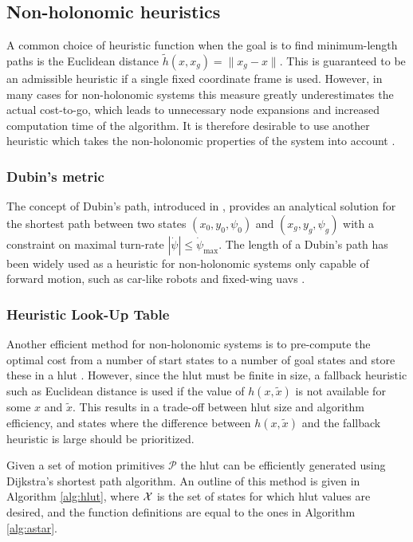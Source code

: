 \subsection{Non-holonomic heuristics}
A common choice of heuristic function when the goal is to find minimum-length paths is the Euclidean distance $\tilde{h}(x, x_g)=\|x_g-x\|$. This is guaranteed to be an admissible heuristic if a single fixed coordinate frame is used. However, in many cases for
non-holonomic systems this measure greatly underestimates the actual cost-to-go, which leads to unnecessary node expansions and 
increased computation time of the algorithm. It is therefore desirable to use another heuristic which takes the non-holonomic properties 
of the system into account \cite{state_lattice_planning}.

\subsubsection{Dubin's metric}
The concept of Dubin's path, introduced in \cite{dubins}, provides an analytical solution for the
shortest path between two states $(x_0,y_0,\psi_0)$ and $(x_g,y_g,\psi_g)$ with a constraint on maximal turn-rate $|\dot{\psi}|\leq\dot{\psi}_{\text{max}}$.
The length of a Dubin's path has been widely used as a heuristic for non-holonomic systems only capable of forward motion, such as car-like robots and fixed-wing \acp{uav} \cite{2_phase_uav}.

\subsubsection{Heuristic Look-Up Table}\label{sec:hlut}
Another efficient method for non-holonomic systems is to pre-compute the optimal cost from a number of start states to 
a number of goal states and store these in a \ac{hlut} \cite{hlut}. However, since the \ac{hlut} 
must be finite in size, a fallback heuristic such as Euclidean distance is used if the value of $h(x,\tilde{x})$ is not available for some $x$ and $\tilde{x}$.
This results in a trade-off between \ac{hlut} size and algorithm efficiency, and states where the difference between $h(x,\tilde{x})$ and the fallback heuristic 
is large should be prioritized.

Given a set of motion primitives $\mathcal{P}$ the \ac{hlut} can be efficiently generated using Dijkstra's shortest path algorithm. 
An outline of this method is given in Algorithm \ref{alg:hlut}, where $\mathcal{X}$ is the set of states for which \ac{hlut} values are desired, and the function definitions 
are equal to the ones in Algorithm \ref{alg:astar}.

